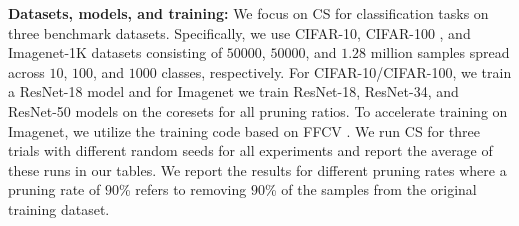 



{\bf Datasets, models, and training:}
We focus on CS for classification tasks on three benchmark datasets. 
Specifically, we use CIFAR-10, CIFAR-100 \cite{krizhevsky2009learning}, and Imagenet-1K \cite{deng2009imagenet} datasets consisting of $50000$, $50000$, and $1.28$ million samples spread across $10$, $100$, and $1000$ classes, respectively. 
For CIFAR-10/CIFAR-100, we train a ResNet-18 model and for Imagenet we train ResNet-18, ResNet-34, and ResNet-50 models on the coresets for all pruning ratios.
To accelerate training on Imagenet, we utilize the training code based on FFCV \cite{leclerc2023ffcv}.
We run CS for three trials with different random seeds for all experiments and report the average of these runs in our tables.
We report the results for different pruning rates where a pruning rate of $90$\% refers to removing $90$\% of the samples from the original training dataset.

